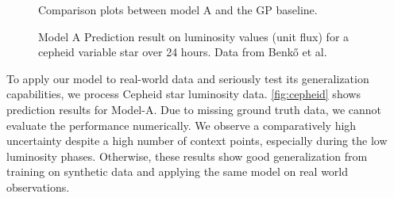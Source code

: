 \begin{figure}
	\centering
	\resizebox{0.5\textwidth}{!}{
		
	}
	\caption{Comparison plots between model A and the GP baseline.}
	\label{fig:gp_comp}
\end{figure}

\begin{figure}
	\centering
	\resizebox{0.4\textwidth}{!}{
		
	}
	\caption{Model A Prediction result on luminosity values (unit flux) for a cepheid variable star over 24 hours. Data from Benkő et al. \cite{Benk__2014}}
	\label{fig:cepheid}
\end{figure}

To apply our model to real-world data and seriously test its generalization capabilities, we process Cepheid star luminosity data. \autoref{fig:cepheid} shows prediction results for Model-A. Due to missing ground truth data, we cannot evaluate the performance numerically. We observe a comparatively high uncertainty despite a high number of context points, especially during the low luminosity phases. Otherwise, these results show good generalization from training on synthetic data and applying the same model on real world observations.


